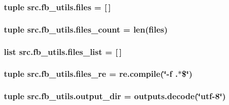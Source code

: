 \hypertarget{namespacesrc_1_1fb__utils_a435c19027706b72a531eda623692de13}{
\subsubsection[{files}]{\setlength{\rightskip}{0pt plus 5cm}tuple src.\-fb\-\_\-utils.\-files = \mbox{[}$\,$\mbox{]}}}\label{namespacesrc_1_1fb__utils_a435c19027706b72a531eda623692de13}
\hypertarget{namespacesrc_1_1fb__utils_a66112e09f3319ed5f0ee51b569c867f6}{
\subsubsection[{files\-\_\-count}]{\setlength{\rightskip}{0pt plus 5cm}tuple src.\-fb\-\_\-utils.\-files\-\_\-count = len({\bf files})}}\label{namespacesrc_1_1fb__utils_a66112e09f3319ed5f0ee51b569c867f6}
\hypertarget{namespacesrc_1_1fb__utils_a09317442a563dfcfc733583405a3b8c9}{
\subsubsection[{files\-\_\-list}]{\setlength{\rightskip}{0pt plus 5cm}list src.\-fb\-\_\-utils.\-files\-\_\-list = \mbox{[}$\,$\mbox{]}}}\label{namespacesrc_1_1fb__utils_a09317442a563dfcfc733583405a3b8c9}
\hypertarget{namespacesrc_1_1fb__utils_abc8054623770bcd1655722e59ffe067e}{
\subsubsection[{files\-\_\-re}]{\setlength{\rightskip}{0pt plus 5cm}tuple src.\-fb\-\_\-utils.\-files\-\_\-re = re.\-compile(\char`\"{}-\/f .$\ast$\$\char`\"{})}}\label{namespacesrc_1_1fb__utils_abc8054623770bcd1655722e59ffe067e}
\hypertarget{namespacesrc_1_1fb__utils_aba80a664165e1497d475c2f9f45fb8dd}{
\subsubsection[{output\-\_\-dir}]{\setlength{\rightskip}{0pt plus 5cm}tuple src.\-fb\-\_\-utils.\-output\-\_\-dir = outputs.\-decode(\char`\"{}utf-\/8\char`\"{})}}\label{namespacesrc_1_1fb__utils_aba80a664165e1497d475c2f9f45fb8dd}
